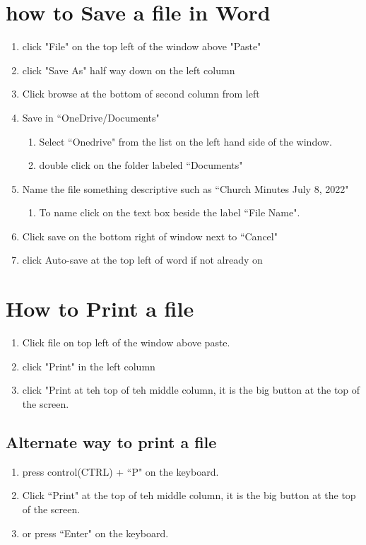 \documentclass[12pt,letterpaper]{article}
\begin{document}
\section{how to Save a file in Word}
\begin{enumerate}
    \item click "File" on the top left of the window above "Paste"
    \item click "Save As" half way down on the left column 
    \item Click browse at the bottom of second column from left
    \item Save in ``OneDrive/Documents"
        \begin{enumerate}
            \item Select ``Onedrive" from the list on the left hand side of the window.
            \item double click on the folder labeled ``Documents"
        \end{enumerate}
    \item Name the file something descriptive such as ``Church Minutes July 8, 2022"
        \begin{enumerate}
           \item To name click on the text box beside the label ``File Name".
        \end{enumerate}
    \item Click save on the bottom right of window next to ``Cancel" 
    \item click Auto-save at the top left of word if not already on
\end{enumerate}
\vspace*{80px}
    \section{How to Print a file}
\begin{enumerate}
    \item Click file on top left of the window above paste.
    \item click "Print" in the left column
    \item click "Print at teh top of teh middle column, it is the big button at the top of the screen.
\end{enumerate}
\subsection{Alternate way to print a file}
\begin{enumerate}
    \item press control(CTRL) + ``P" on the keyboard.
    \item Click ``Print" at the top of teh middle column, it is the big button at the top of the screen. 
    \item or press ``Enter" on the keyboard.
\end{enumerate}
\end{document}
